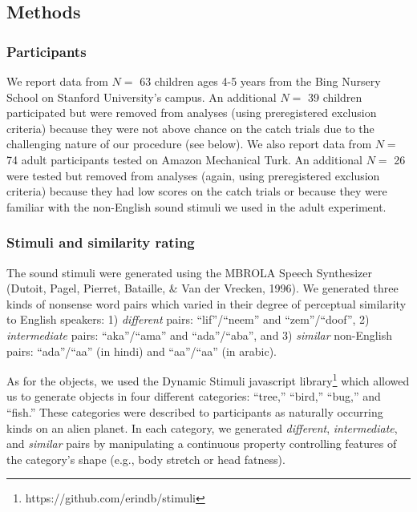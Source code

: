\documentclass[english,,man,floatsintext]{apa6}
\let\rmarkdownfootnote\footnote%
\def\footnote{\protect\rmarkdownfootnote}
\theoremstyle{definition}
\theoremstyle{definition}
\theoremstyle{definition}
\theoremstyle{remark}
\begin{document}
\subsection{Methods}\label{methods}

\subsubsection{Participants}\label{participants}

We report data from \(N=\) 63 children ages 4-5 years from the Bing
Nursery School on Stanford University's campus. An additional \(N=\) 39
children participated but were removed from analyses (using
preregistered exclusion criteria) because they were not above chance on
the catch trials due to the challenging nature of our procedure (see
below). We also report data from \(N=\) 74 adult participants tested on
Amazon Mechanical Turk. An additional \(N=\) 26 were tested but removed
from analyses (again, using preregistered exclusion criteria) because
they had low scores on the catch trials or because they were familiar
with the non-English sound stimuli we used in the adult experiment.

\subsubsection{Stimuli and similarity
rating}\label{stimuli-and-similarity-rating}

The sound stimuli were generated using the MBROLA Speech Synthesizer
(Dutoit, Pagel, Pierret, Bataille, \& Van der Vrecken, 1996). We
generated three kinds of nonsense word pairs which varied in their
degree of perceptual similarity to English speakers: 1) \emph{different}
pairs: \enquote{lif}/\enquote{neem} and \enquote{zem}/\enquote{doof}, 2)
\emph{intermediate} pairs: \enquote{aka}/\enquote{ama} and
\enquote{ada}/\enquote{aba}, and 3) \emph{similar} non-English pairs:
\enquote{ada}/\enquote{aa} (in hindi) and
\enquote{aa}/\enquote{a\textipa{\textcrh}a} (in arabic).

As for the objects, we used the Dynamic Stimuli javascript
library\footnote{https://github.com/erindb/stimuli} which allowed us to
generate objects in four different categories: \enquote{tree,}
\enquote{bird,} \enquote{bug,} and \enquote{fish.} These categories were
described to participants as naturally occurring kinds on an alien
planet. In each category, we generated \emph{different},
\emph{intermediate}, and \emph{similar} pairs by manipulating a
continuous property controlling features of the category's shape (e.g.,
body stretch or head fatness).
\end{document}
